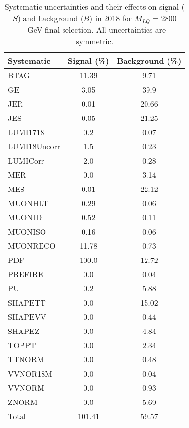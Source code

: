 \begin{table}[htbp]
\begin{center}
\caption{Systematic uncertainties and their effects on signal ($S$) and background ($B$) in 2018 for $M_{LQ}=2800$~GeV final selection. All uncertainties are symmetric.}
\begin{tabular}{lcc}
\hline\hline
Systematic & Signal (\%) & Background (\%) \\ \hline 
BTAG & 11.39 & 9.71\\ 
GE & 3.05 & 39.9\\ 
JER & 0.01 & 20.66\\ 
JES & 0.05 & 21.25\\ 
LUMI1718 & 0.2 & 0.07\\ 
LUMI18Uncorr & 1.5 & 0.23\\ 
LUMICorr & 2.0 & 0.28\\ 
MER & 0.0 & 3.14\\ 
MES & 0.01 & 22.12\\ 
MUONHLT & 0.29 & 0.06\\ 
MUONID & 0.52 & 0.11\\ 
MUONISO & 0.16 & 0.06\\ 
MUONRECO & 11.78 & 0.73\\ 
PDF & 100.0 & 12.72\\ 
PREFIRE & 0.0 & 0.04\\ 
PU & 0.2 & 5.88\\ 
SHAPETT & 0.0 & 15.02\\ 
SHAPEVV & 0.0 & 0.44\\ 
SHAPEZ & 0.0 & 4.84\\ 
TOPPT & 0.0 & 2.34\\ 
TTNORM & 0.0 & 0.48\\ 
VVNOR18M & 0.0 & 0.04\\ 
VVNORM & 0.0 & 0.93\\ 
ZNORM & 0.0 & 5.69\\ 
Total & 101.41 & 59.57\\ \hline \hline
\end{tabular}
\label{tab:SysUncertainties_uujj_2800}
\end{center}
\end{table}

